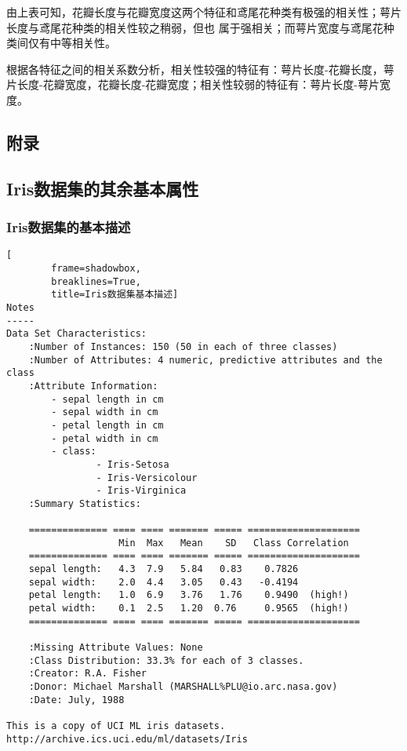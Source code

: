 \documentclass[12pt,a4paper]{article}
\theoremstyle{definition}
\begin{document}
由上表可知，花瓣长度与花瓣宽度这两个特征和鸢尾花种类有极强的相关性；萼片长度与鸢尾花种类的相关性较之稍弱，但也 属于强相关；而萼片宽度与鸢尾花种类间仅有中等相关性。

根据各特征之间的相关系数分析，相关性较强的特征有：萼片长度-花瓣长度，萼片长度-花瓣宽度，花瓣长度-花瓣宽度；相关性较弱的特征有：萼片长度-萼片宽度。

\newpage
\begin{appendix}
	\section{附录}
	\subsection{Iris数据集的其余基本属性}
	
	\subsubsection{Iris数据集的基本描述}
		\label{apd:iris_basic}
		\begin{lstlisting}[
		frame=shadowbox,
		breaklines=True,
		title=Iris数据集基本描述]
Notes
-----
Data Set Characteristics:
    :Number of Instances: 150 (50 in each of three classes)
    :Number of Attributes: 4 numeric, predictive attributes and the class
    :Attribute Information:
        - sepal length in cm
        - sepal width in cm
        - petal length in cm
        - petal width in cm
        - class:
                - Iris-Setosa
                - Iris-Versicolour
                - Iris-Virginica
    :Summary Statistics:

    ============== ==== ==== ======= ===== ====================
                    Min  Max   Mean    SD   Class Correlation
    ============== ==== ==== ======= ===== ====================
    sepal length:   4.3  7.9   5.84   0.83    0.7826
    sepal width:    2.0  4.4   3.05   0.43   -0.4194
    petal length:   1.0  6.9   3.76   1.76    0.9490  (high!)
    petal width:    0.1  2.5   1.20  0.76     0.9565  (high!)
    ============== ==== ==== ======= ===== ====================

    :Missing Attribute Values: None
    :Class Distribution: 33.3% for each of 3 classes.
    :Creator: R.A. Fisher
    :Donor: Michael Marshall (MARSHALL%PLU@io.arc.nasa.gov)
    :Date: July, 1988

This is a copy of UCI ML iris datasets.
http://archive.ics.uci.edu/ml/datasets/Iris


\end{lstlisting}
\end{appendix}
\end{document}
